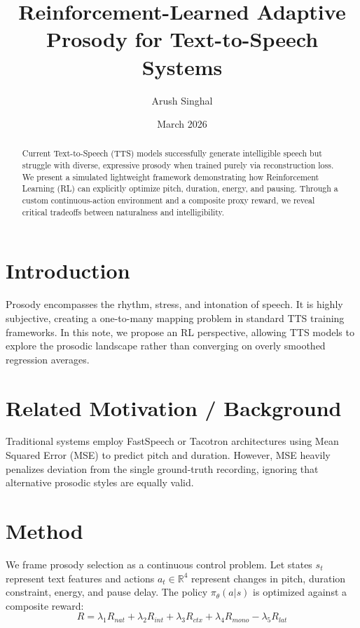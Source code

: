 \documentclass[11pt,a4paper]{article}
\title{\textbf{Reinforcement-Learned Adaptive Prosody for Text-to-Speech Systems}}
\author{Arush Singhal}
\date{March 2026}
\begin{document}
\maketitle

\begin{abstract}
Current Text-to-Speech (TTS) models successfully generate intelligible speech but struggle with diverse, expressive prosody when trained purely via reconstruction loss. We present a simulated lightweight framework demonstrating how Reinforcement Learning (RL) can explicitly optimize pitch, duration, energy, and pausing. Through a custom continuous-action environment and a composite proxy reward, we reveal critical tradeoffs between naturalness and intelligibility.
\end{abstract}

\section{Introduction}
Prosody encompasses the rhythm, stress, and intonation of speech. It is highly subjective, creating a one-to-many mapping problem in standard TTS training frameworks. In this note, we propose an RL perspective, allowing TTS models to explore the prosodic landscape rather than converging on overly smoothed regression averages.

\section{Related Motivation / Background}
Traditional systems employ FastSpeech or Tacotron architectures using Mean Squared Error (MSE) to predict pitch and duration. However, MSE heavily penalizes deviation from the single ground-truth recording, ignoring that alternative prosodic styles are equally valid. 

\section{Method}
We frame prosody selection as a continuous control problem. Let states $s_t$ represent text features and actions $a_t \in \mathbb{R}^4$ represent changes in pitch, duration constraint, energy, and pause delay. The policy $\pi_\theta(a|s)$ is optimized against a composite reward:
\begin{equation}
R = \lambda_1 R_{nat} + \lambda_2 R_{int} + \lambda_3 R_{ctx} + \lambda_4 R_{mono} - \lambda_5 R_{lat}
\end{equation}
\end{document}
